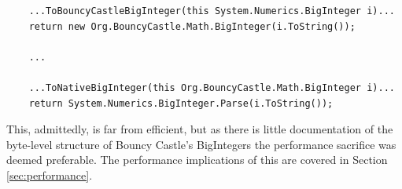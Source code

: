 \begin{verbatim}
	...ToBouncyCastleBigInteger(this System.Numerics.BigInteger i)...
	return new Org.BouncyCastle.Math.BigInteger(i.ToString());
	
	...
	
	...ToNativeBigInteger(this Org.BouncyCastle.Math.BigInteger i)...
	return System.Numerics.BigInteger.Parse(i.ToString());
\end{verbatim}

This, admittedly, is far from efficient, but as there is little documentation of the byte-level structure
of Bouncy Castle's BigIntegers the performance sacrifice was deemed preferable. The performance implications
of this are covered in Section \ref{sec:performance}.